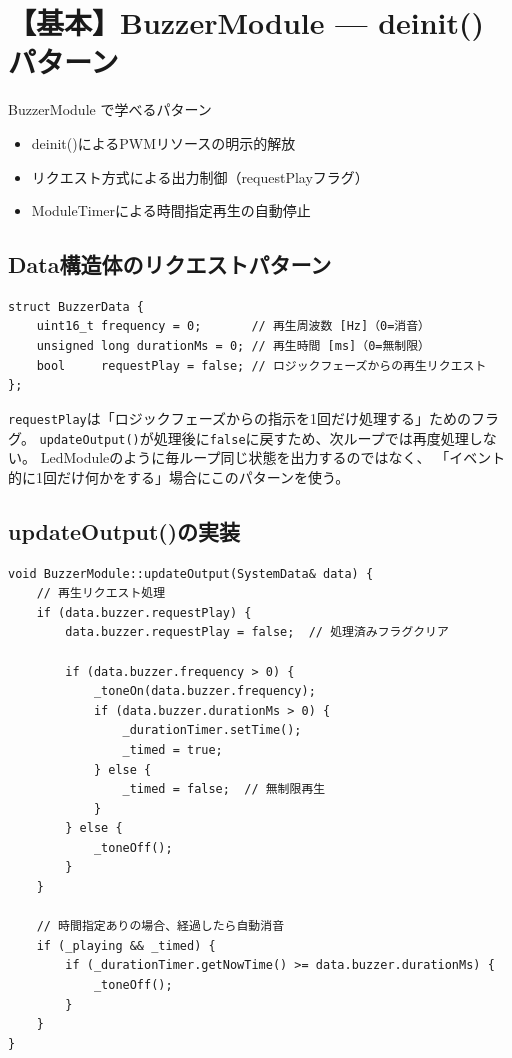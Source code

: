 \section{【基本】BuzzerModule — deinit()パターン}

\begin{patternbox}{BuzzerModule で学べるパターン}
\begin{itemize}
    \item deinit()によるPWMリソースの明示的解放
    \item リクエスト方式による出力制御（requestPlayフラグ）
    \item ModuleTimerによる時間指定再生の自動停止
\end{itemize}
\end{patternbox}

\subsection{Data構造体のリクエストパターン}

\begin{lstlisting}[style=cppstyle, caption={BuzzerModule.h — Data}]
struct BuzzerData {
    uint16_t frequency = 0;       // 再生周波数 [Hz]（0=消音）
    unsigned long durationMs = 0; // 再生時間 [ms]（0=無制限）
    bool     requestPlay = false; // ロジックフェーズからの再生リクエスト
};
\end{lstlisting}

\begin{pointbox}[リクエストフラグパターン]
\texttt{requestPlay}は「ロジックフェーズからの指示を1回だけ処理する」ためのフラグ。
\texttt{updateOutput()}が処理後に\texttt{false}に戻すため、次ループでは再度処理しない。
LedModuleのように毎ループ同じ状態を出力するのではなく、
「イベント的に1回だけ何かをする」場合にこのパターンを使う。
\end{pointbox}

\subsection{updateOutput()の実装}

\begin{lstlisting}[style=cppstyle, caption={BuzzerModule.cpp — updateOutput()}]
void BuzzerModule::updateOutput(SystemData& data) {
    // 再生リクエスト処理
    if (data.buzzer.requestPlay) {
        data.buzzer.requestPlay = false;  // 処理済みフラグクリア

        if (data.buzzer.frequency > 0) {
            _toneOn(data.buzzer.frequency);
            if (data.buzzer.durationMs > 0) {
                _durationTimer.setTime();
                _timed = true;
            } else {
                _timed = false;  // 無制限再生
            }
        } else {
            _toneOff();
        }
    }

    // 時間指定ありの場合、経過したら自動消音
    if (_playing && _timed) {
        if (_durationTimer.getNowTime() >= data.buzzer.durationMs) {
            _toneOff();
        }
    }
}
\end{lstlisting}

